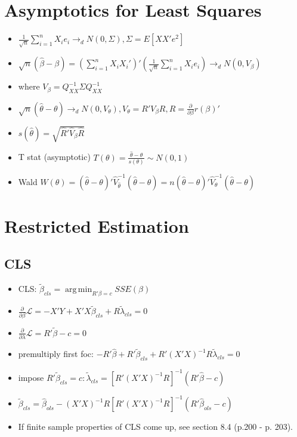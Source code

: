 \documentclass[11pt]{article} %
\DeclareMathOperator*{\argmin}{arg\,min}
\begin{document}
\section{Asymptotics for Least Squares}
\begin{itemize}
\item $\frac{1}{\sqrt{n}} \sum_{i=1}^n X_i e_i \rightarrow_d N(0,\Sigma), \Sigma = E[XX'e^2]$
\item $\sqrt{n}(\hat{\beta} - \beta) = \left( \sum_{i=1}^nX_iX_i' \right)' \left( \frac{1}{\sqrt{n}}\sum_{i=1}^nX_ie_i \right)\rightarrow_d N(0,V_{\beta})$
\item where $V_{\beta} = Q_{XX}^{-1} \Sigma Q_{XX}^{-1}$
\item $\sqrt{n} (\hat{\theta} - \theta) \rightarrow_d N(0,V_{\theta}), V_{\theta} = R'V_{\beta}R, R = \frac{\partial}{\partial \beta} r(\beta)'$
\item $s(\hat{\theta}) = \sqrt{\hat{R}'\hat{V}_{\beta}\hat{R}}$
\item T stat (asymptotic) $T(\theta) = \frac{\hat{\theta} - \theta}{s(\theta)} \sim N(0,1)$
\item Wald $W(\theta) = (\hat{\theta} - \theta)'\hat{V}_{\hat{\theta}}^{-1}(\hat{\theta} - \theta) = n(\hat{\theta} - \theta)'\hat{V}_{\theta}^{-1}(\hat{\theta} - \theta)$
\end{itemize}
\section{Restricted Estimation}
\subsection{CLS}
\begin{itemize}
\item CLS: $\tilde{\beta}_{cls} = \argmin_{R'\beta = c} SSE(\beta)$
\item $\frac{\partial}{\partial \beta} \mathcal{L} = -X'Y + X'X\tilde{\beta}_{cls} + R\tilde{\lambda}_{cls} = 0$
\item $\frac{\partial }{\partial \lambda} \mathcal{L} = R'\tilde{\beta} - c = 0$
\item premultiply first foc: $-R'\hat{\beta} + R'\tilde{\beta}_{cls} + R'(X'X)^{-1} R\tilde{\lambda}_{cls} = 0$
\item impose $R'\tilde{\beta}_{cls} = c: \tilde{\lambda}_{cls} = [R'(X'X)^{-1}R]^{-1}(R'\hat{\beta} - c)$
\item $\tilde{\beta}_{cls} = \hat{\beta}_{ols} - (X'X)^{-1}R[R'(X'X)^{-1}R]^{-1} (R'\hat{\beta}_{ols} - c)$
\item If finite sample properties of CLS come up, see section 8.4 (p.200 - p. 203).
\end{itemize}
\end{document}

